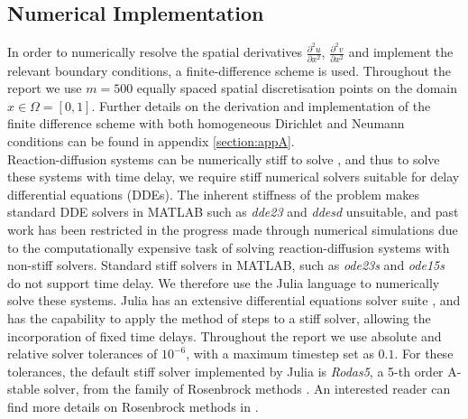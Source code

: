 \subsection{Numerical Implementation}\label{section:numimp}
In order to numerically resolve the spatial derivatives $\frac{\partial^2 u}{\partial x^2}$, $\frac{\partial^2 v}{\partial x^2}$ and implement the relevant boundary conditions, a finite-difference scheme is used. Throughout the report we use $m=500$ equally spaced spatial discretisation points on the domain $x\in\Omega=[0,1]$. Further details on the derivation and implementation of the finite difference scheme with both homogeneous Dirichlet and Neumann conditions can be found in appendix \ref{section:appA}.
\\
Reaction-diffusion systems can be numerically stiff to solve \cite{stiff1, william}, and thus to solve these systems with time delay, we require stiff numerical solvers suitable for delay differential equations (DDEs). The inherent stiffness of the problem makes standard DDE solvers in MATLAB such as \emph{dde23} and \emph{ddesd} unsuitable, and past work has been restricted in the progress made through numerical simulations \cite{william} due to the computationally expensive task of solving reaction-diffusion systems with non-stiff solvers. Standard stiff solvers in MATLAB, such as \emph{ode23s} and \emph{ode15s} do not support time delay. We therefore use the Julia language to numerically solve these systems. Julia has an extensive differential equations solver suite \cite{rodas}, and has the capability to apply the method of steps \cite{methsteps} to a stiff solver, allowing the incorporation of fixed time delays. Throughout the report we use absolute and relative solver tolerances of $10^{-6}$, with a maximum timestep set as $0.1$. For these tolerances, the default stiff solver implemented by Julia is \emph{Rodas5}, a 5-th order A-stable solver, from the family of Rosenbrock methods \cite{rodas}. An interested reader can find more details on Rosenbrock methods in \cite{rosenbrock}.
